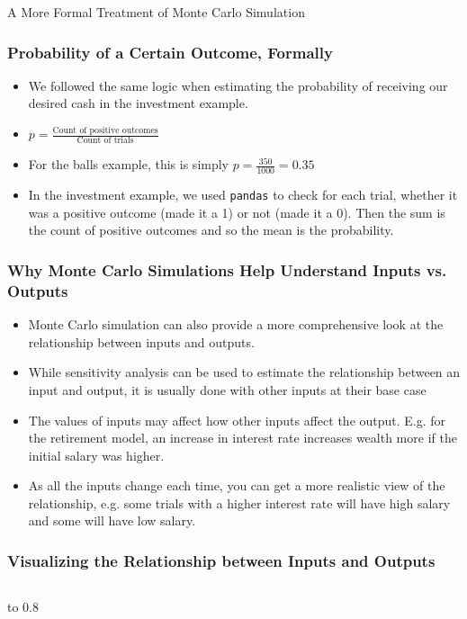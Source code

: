 \documentclass[handout, 11pt]{beamer}
\begin{document}
\begin{section}[Formal MC]{A More Formal Treatment of Monte Carlo Simulation}
\begin{frame}
\frametitle{Probability of a Certain Outcome, Formally}
\begin{itemize}
\item We followed the same logic when estimating the probability of receiving our desired cash in the investment example.
\vfill
\item $p = \frac{\text{Count of positive outcomes}}{\text{Count of trials}}$
\vfill
\item For the balls example, this is simply
$p = \frac{350}{1000} = 0.35$
\vfill
\item In the investment example, we used
\texttt{pandas}
to check for each trial, whether it was a positive outcome (made it a 1) or not (made it a 0). Then the sum is the count of positive outcomes and so the mean is the probability.
\end{itemize}
\end{frame}
\begin{frame}
\frametitle{Why Monte Carlo Simulations Help Understand Inputs vs. Outputs}
\begin{itemize}
\item Monte Carlo simulation can also provide a more comprehensive look at the relationship between inputs and outputs.
\vfill
\item While sensitivity analysis can be used to estimate the relationship between an input and output, it is usually done with other inputs at their base case
\vfill
\item The values of inputs may affect how other inputs affect the output. E.g. for the retirement model, an increase in interest rate increases wealth more if the initial salary was higher.
\vfill
\item As all the inputs change each time, you can get a more realistic view of the relationship, e.g. some trials with a higher interest rate will have high salary and some will have low salary.
\end{itemize}
\end{frame}
\begin{frame}
\frametitle{Visualizing the Relationship between Inputs and Outputs}
\begin{columns}
\begin{column}{0.5\textwidth}
\vbox to 0.8
\end{column}

\end{columns}
\end{frame}
\end{section}
\end{document}
